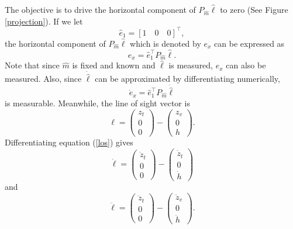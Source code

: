 The objective is to drive the horizontal component of $P_{\hat{m}}\hat{\ell}$ to zero (See Figure \ref{projection}). If we let
\begin{equation}
\hat{e}_1=[1 \quad 0 \quad 0]^\top,
\label{e_1}
\end{equation}
the horizontal component of $P_{\hat{m}}\hat{\ell}$ which is denoted by $e_x$ can be expressed as
\begin{equation}
e_x=\hat{e}_1^{\top}P_{\hat{m}}\hat{\ell}.
\end{equation}
Note that since $\hat{m}$ is fixed and known and $\hat{\ell}$ is measured, $e_x$ can also be measured. Also, since $\dot{\hat{\ell}}$ can be approximated by differentiating numerically,
\begin{equation}
\dot{e}_x=\hat{e}_1^{\top}P_{\hat{m}}\dot{\hat{\ell}}
\label{exdot}
\end{equation} is measurable.
Meanwhile, the line of sight vector is
\begin{equation}
\ell=\begin{pmatrix} z_t \\ 0 \\ 0 \end{pmatrix}
-\begin{pmatrix} z_v \\ 0 \\ h \end{pmatrix}.
\label{los}
\end{equation}
Differentiating equation (\ref{los}) gives 
\begin{equation}
\dot{\ell}=\begin{pmatrix} \dot{z}_t \\ 0 \\ 0 \end{pmatrix}
-\begin{pmatrix} \dot{z}_t \\ 0 \\ \dot{h} \end{pmatrix}
\end{equation}
and
\begin{equation}
\ddot{\ell}=\begin{pmatrix} \ddot{z}_t \\ 0 \\ 0 \end{pmatrix}
-\begin{pmatrix} \ddot{z}_v \\ 0 \\ \ddot{h} \end{pmatrix}.
\end{equation}
